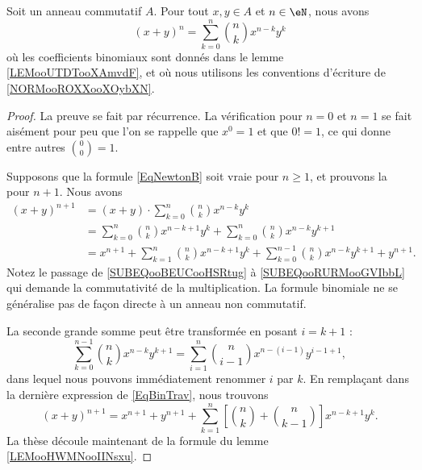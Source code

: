 \begin{proposition}     \label{PropBinomFExOiL}
	Soit un anneau commutatif \( A\). Pour tout \( x,y\in A\) et \( n\in \eN\), nous avons
	\begin{equation}        \label{EqNewtonB}
		(x+y)^n=\sum_{k=0}^n{n\choose k}x^{n-k}y^k
	\end{equation}
	où les coefficients binomiaux sont donnés dans le lemme \ref{LEMooUTDTooXAmvdF}, et où nous utilisons les conventions d'écriture de \ref{NORMooROXXooXOybXN}.
\end{proposition}

\begin{proof}
	La preuve se fait par récurrence. La vérification pour \( n=0\) et \( n=1\) se fait aisément pour peu que l'on se rappelle que \( x^0=1\) et que \( 0!=1\), ce qui donne entre autres \( {0\choose 0}=1\).

	Supposons que la formule \eqref{EqNewtonB} soit vraie pour \( n\geq1\), et prouvons la pour \( n+1\). Nous avons
	\begin{subequations}\label{EqBinTrav}
		\begin{align}
			(x+y)^{n+1} & = (x+y)\cdot \sum_{k=0}^n{n\choose k}x^{n-k}y^k                                                  \label{SUBEQooBEUCooHSRtug}  \\
			            & = \sum_{k=0}^n{n\choose k}x^{n-k+1}y^k+\sum_{k=0}^n{n\choose k}x^{n-k}y^{k+1}                     \label{SUBEQooRURMooGVIbbL} \\
			            & = x^{n+1}+ \sum_{k=1}^n{n\choose k}x^{n-k+1}y^k+\sum_{k=0}^{n-1}{n\choose k}x^{n-k}y^{k+1}+y^{n+1}.
		\end{align}
	\end{subequations}
	Notez le passage de \eqref{SUBEQooBEUCooHSRtug} à \eqref{SUBEQooRURMooGVIbbL} qui demande la commutativité de la multiplication. La formule binomiale ne se généralise pas de façon directe à un anneau non commutatif.

	La seconde grande somme peut être transformée en posant \( i=k+1\) :
	\begin{equation}
		\sum_{k=0}^{n-1}{n\choose k}x^{n-k}y^{k+1} = \sum_{i=1}^n{n\choose i-1}x^{n-(i-1)}y^{i-1+1},
	\end{equation}
	dans lequel nous pouvons immédiatement renommer \( i\) par \( k\). En remplaçant dans la dernière expression de \eqref{EqBinTrav}, nous trouvons
	\begin{equation}
		(x+y)^{n+1}=x^{n+1}+y^{n+1}+\sum_{k=1}^n\left[ {n\choose k}+{n\choose k-1} \right]x^{n-k+1}y^k.
	\end{equation}
	La thèse découle maintenant de la formule du lemme \ref{LEMooHWMNooIINsxu}.
\end{proof}

